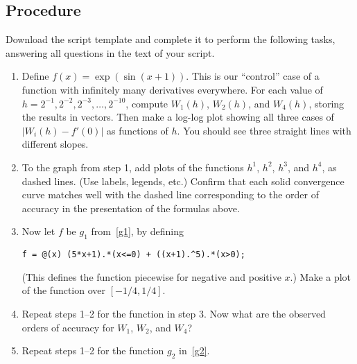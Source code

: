 \documentclass[11pt,twoside]{article}
\begin{document}
\subsection*{Procedure}

Download the script template and complete it to perform the following tasks, answering all questions in the text of your script. 

\begin{enumerate}
\item Define $f(x)=\exp(\sin(x+1))$. This is our ``control'' case of a function with infinitely many derivatives everywhere. For each value of $h=2^{-1},2^{-2},2^{-3},\ldots,2^{-10}$, compute $W_1(h)$, $W_2(h)$, and $W_4(h)$, storing the results in vectors. Then make a log-log plot showing all three cases of $|W_i(h)-f'(0)|$ as functions of $h$. You should see three straight lines with different slopes.

\item To the graph from step 1, add plots of the functions $h^1$, $h^2$, $h^3$, and $h^4$, as dashed lines. (Use labels, legends, etc.)  Confirm that each solid convergence curve matches well with the dashed line corresponding to the order of accuracy in the presentation of the formulas above.

\item Now let $f$ be $g_1$ from~\eqref{g1}, by defining 
\begin{verbatim}
f = @(x) (5*x+1).*(x<=0) + ((x+1).^5).*(x>0);
\end{verbatim}
(This defines the function piecewise for negative and positive $x$.) Make a plot of the function over $[-1/4,1/4]$.

\item Repeat steps 1--2 for the function in step 3. Now what are the observed orders of accuracy for $W_1$, $W_2$, and $W_4$?
  
\item Repeat steps 1--2 for the function $g_2$ in~\eqref{g2}.
  
\end{enumerate}
\end{document}
